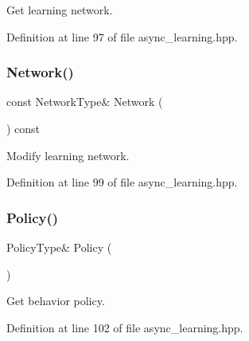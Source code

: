 Get learning network. 



Definition at line 97 of file async\+\_\+learning.\+hpp.

\mbox{\label{classmlpack_1_1rl_1_1AsyncLearning_a0ce8c122193c6a20fd4b397bc8525f7d}} 
\subsubsection{Network()\hspace{0.1cm}{\footnotesize\ttfamily [2/2]}}
{\footnotesize\ttfamily const Network\+Type\& Network (\begin{DoxyParamCaption}{ }\end{DoxyParamCaption}) const\hspace{0.3cm}{\ttfamily [inline]}}



Modify learning network. 



Definition at line 99 of file async\+\_\+learning.\+hpp.

\mbox{\label{classmlpack_1_1rl_1_1AsyncLearning_a1ef80c7b0a3fb5468b9d920fef109d36}} 
\subsubsection{Policy()\hspace{0.1cm}{\footnotesize\ttfamily [1/2]}}
{\footnotesize\ttfamily Policy\+Type\& Policy (\begin{DoxyParamCaption}{ }\end{DoxyParamCaption})\hspace{0.3cm}{\ttfamily [inline]}}



Get behavior policy. 



Definition at line 102 of file async\+\_\+learning.\+hpp.

\mbox{\label{classmlpack_1_1rl_1_1AsyncLearning_a04e9dd2c0ef71ea0e2cb126233652bfa}} 
